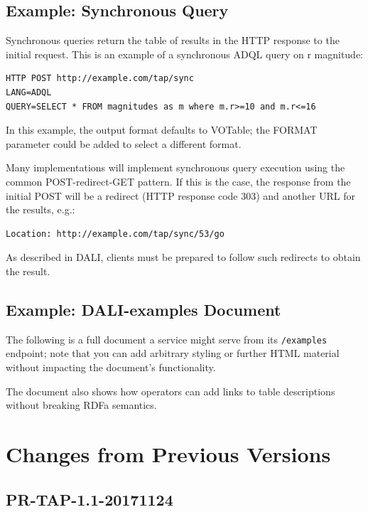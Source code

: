 \documentclass[11pt,letter]{ivoa}
\begin{document}
\subsection{Example: Synchronous Query}

Synchronous queries return the table of results in the HTTP response to the 
initial request. This is an example of a synchronous ADQL query on r magnitude:

\begin{verbatim}
HTTP POST http://example.com/tap/sync
LANG=ADQL
QUERY=SELECT * FROM magnitudes as m where m.r>=10 and m.r<=16
\end{verbatim}

In this example, the output format defaults to VOTable; 
the FORMAT parameter could be added to select a different format.

Many implementations will implement synchronous query execution using the 
common POST-redirect-GET pattern. If this is the case, the response from the 
initial POST will be a redirect (HTTP response code 303) and another URL for the 
results, e.g.: 

\begin{verbatim}
Location: http://example.com/tap/sync/53/go
\end{verbatim}

As described in DALI, clients must be prepared to follow such 
redirects to obtain the result.

\subsection{Example: DALI-examples Document}
\label{sect:example-example}

The following is a full document a service might serve from its
\verb|/examples| endpoint; note that you can add arbitrary styling or
further HTML material without impacting the document's functionality.

The document also shows how operators can add links to table
descriptions without breaking RDFa semantics.



\appendix

\section{Changes from Previous Versions}

\subsection{PR-TAP-1.1-20171124}
\end{document}
